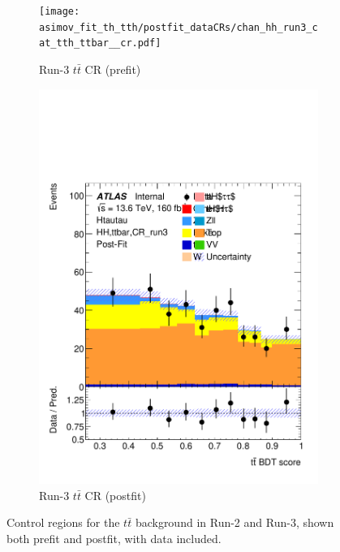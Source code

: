 \begin{figure}[h]
  \begin{subfigure}[t]{0.45\textwidth}
    \centering
    \texttt{[image: asimov\_fit\_th\_tth/postfit\_dataCRs/chan\_hh\_run3\_cat\_tth\_ttbar\_\_cr.pdf]}
    \caption{Run-3 $t\bar{t}$ CR (prefit)}
  \end{subfigure}
  \hfill
  \begin{subfigure}[t]{0.45\textwidth}
    \centering
    \includegraphics[width=\linewidth]{images/asimov_fit_th_tth/postfit_dataCRs/chan_hh_run3_cat_tth_ttbar__cr_postFit.pdf}
    \caption{Run-3 $t\bar{t}$ CR (postfit)}
  \end{subfigure}

  \caption{Control regions for the $t\bar{t}$ background in Run-2 and Run-3, shown both prefit and postfit, with data included.}
  \label{fig:ttbar_crs}
\end{figure}

